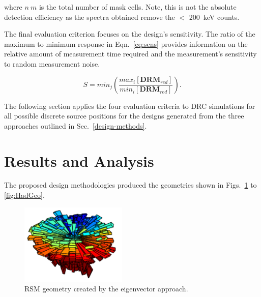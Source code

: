 \documentclass[3p,times]{elsarticle}
\begin{document}
\noindent where $n\ m$ is the total number of mask cells.
Note, this is not the absolute detection efficiency as the spectra obtained remove the $<$ 200~keV counts.

The final evaluation criterion focuses on the design's sensitivity.  
The ratio of the maximum to minimum response in Eqn.~\ref{eq:sens} provides information on the relative amount of measurement time required and the measurement's sensitivity to random measurement noise. 

\begin{equation}
S=min_{j}\left(\frac{max_{i} \left[\mathbf{DRM}_{red}\right]}{min_{i} \left[\mathbf{DRM}_{red}\right]}\right).
\label{eq:sens}
\end{equation}

The following section applies the four evaluation criteria to DRC simulations for all possible discrete source positions for the designs generated from the three approaches outlined in Sec.~\ref{design-methods}.

\section{Results and Analysis} \label{sec:results}
The proposed design methodologies produced the geometries shown in Figs.~\ref{fig:EVGeo} to \ref{fig:HadGeo}.

\begin{figure}[ht!]
\centering
\includegraphics[width={2.0in}]{../figs/EVGeo.pdf}
\caption{RSM geometry created by the eigenvector approach.}
\label{fig:EVGeo}
\end{figure}
\end{document}
